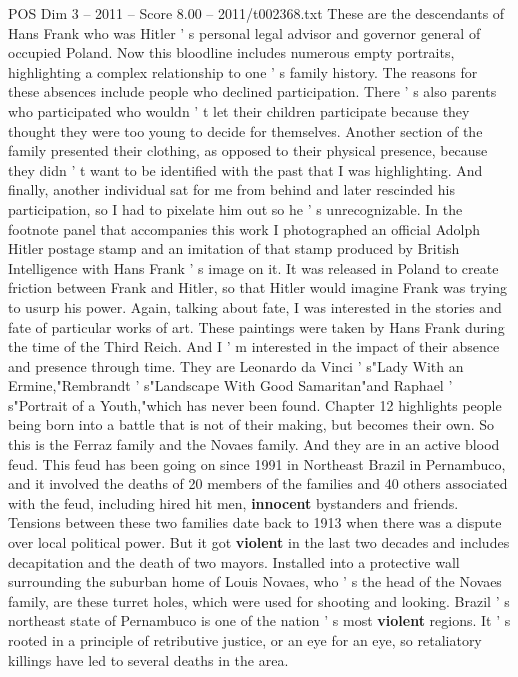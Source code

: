 \begin{textsample}{POS Dim 3 – 2011 – Score 8.00 – 2011/t002368.txt}
These are the descendants of Hans Frank who was Hitler ' s personal legal advisor and governor general of occupied Poland.
Now this bloodline includes numerous empty portraits, highlighting a complex relationship to one ' s family history.
The reasons for these absences include people who declined participation.
There ' s also parents who participated who wouldn ' t let their children participate because they thought they were too young to decide for themselves.
Another section of the family presented their clothing, as opposed to their physical presence, because they didn ' t want to be identified with the past that I was highlighting.
And finally, another individual sat for me from behind and later rescinded his participation, so I had to pixelate him out so he ' s unrecognizable.
In the footnote panel that accompanies this work I photographed an official Adolph Hitler postage stamp and an imitation of that stamp produced by British Intelligence with Hans Frank ' s image on it.
It was released in Poland to create friction between Frank and Hitler, so that Hitler would imagine Frank was trying to usurp his power.
Again, talking about fate, I was interested in the stories and fate of particular works of art.
These paintings were taken by Hans Frank during the time of the Third Reich.
And I ' m interested in the impact of their absence and presence through time.
They are Leonardo da Vinci ' s"Lady With an Ermine,"Rembrandt ' s"Landscape With Good Samaritan"and Raphael ' s"Portrait of a Youth,"which has never been found.
Chapter 12 highlights people being born into a battle that is not of their making, but becomes their own.
So this is the Ferraz family and the Novaes family.
And they are in an active blood feud.
This feud has been going on since 1991 in Northeast Brazil in Pernambuco, and it involved the deaths of 20 members of the families and 40 others associated with the feud, including hired hit men, \textbf{innocent} bystanders and friends.
Tensions between these two families date back to 1913 when there was a dispute over local political power.
But it got \textbf{violent} in the last two decades and includes decapitation and the death of two mayors.
Installed into a protective wall surrounding the suburban home of Louis Novaes, who ' s the head of the Novaes family, are these turret holes, which were used for shooting and looking.
Brazil ' s northeast state of Pernambuco is one of the nation ' s most \textbf{violent} regions.
It ' s rooted in a principle of retributive justice, or an eye for an eye, so retaliatory killings have led to several deaths in the area.

\end{textsample}
